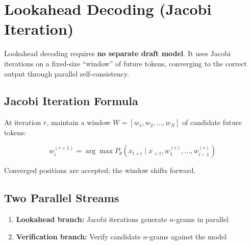\documentclass[11pt,a4paper]{article}
\begin{document}
\section{Lookahead Decoding (Jacobi Iteration)}

Lookahead decoding requires \textbf{no separate draft model}. It uses Jacobi iterations on a fixed-size ``window'' of future tokens, converging to the correct output through parallel self-consistency.

\subsection{Jacobi Iteration Formula}

At iteration $r$, maintain a window $W = [w_1, w_2, \ldots, w_N]$ of candidate future tokens:

$$w_i^{(r+1)} = \arg\max P_\theta(x_{t+i} \mid x_{<t}, w_1^{(r)}, \ldots, w_{i-1}^{(r)})$$

Converged positions are accepted; the window shifts forward.

\subsection{Two Parallel Streams}

\begin{enumerate}[itemsep=1pt]
  \item \textbf{Lookahead branch:} Jacobi iterations generate $n$-grams in parallel
  \item \textbf{Verification branch:} Verify candidate $n$-grams against the model
\end{enumerate}
\end{document}

